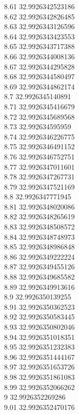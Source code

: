 {8.61	32.9926342523186\\
8.62	32.9926342826485\\
8.63	32.9926343126596\\
8.64	32.9926343423553\\
8.65	32.9926343717388\\
8.66	32.9926344008136\\
8.67	32.9926344295828\\
8.68	32.9926344580497\\
8.69	32.9926344862174\\
8.7	32.9926345140891\\
8.71	32.9926345416679\\
8.72	32.9926345689568\\
8.73	32.992634595959\\
8.74	32.9926346226775\\
8.75	32.9926346491152\\
8.76	32.9926346752751\\
8.77	32.9926347011601\\
8.78	32.9926347267731\\
8.79	32.9926347521169\\
8.8	32.9926347771945\\
8.81	32.9926348020086\\
8.82	32.9926348265619\\
8.83	32.9926348508572\\
8.84	32.9926348748973\\
8.85	32.9926348986848\\
8.86	32.9926349222224\\
8.87	32.9926349455126\\
8.88	32.9926349685582\\
8.89	32.9926349913616\\
8.9	32.9926350139255\\
8.91	32.9926350362523\\
8.92	32.9926350583445\\
8.93	32.9926350802046\\
8.94	32.9926351018351\\
8.95	32.9926351232383\\
8.96	32.9926351444167\\
8.97	32.9926351653726\\
8.98	32.9926351861083\\
8.99	32.9926352066262\\
9	32.9926352269286\\
9.01	32.9926352470176\\
}
